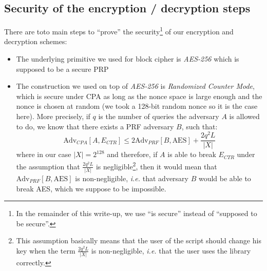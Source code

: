 \documentclass[10pt,twocolumn]{article}
\begin{document}

\subsection{Security of the encryption / decryption steps}\label{security-encryption-decryption}

There are toto main steps to ``prove'' the security\footnote{In the remainder of this write-up, we use ``is secure''
instead of ``supposed to be secure''.}  of our encryption and decryption schemes:
\begin{itemize}
\item The underlying primitive we used for block cipher is \emph{AES-256} which is supposed to be a secure PRP
\item The construction we used on top of \emph{AES-256} is \emph{Randomized Counter Mode}, which is secure under CPA as long as the nonce space is large enough and the nonce is chosen at random (we took a 128-bit random nonce so it is the case here).
More precisely, if $q$ is the number of queries the adversary $A$ is allowed to do, we know that there exists a PRF adversary $B$, such that:
\begin{equation}\label{eq:sec1}
 \text{Adv}_{CPA}[A,E_{CTR}] \leq 2 \text{Adv}_{PRF}[B,\text{AES}] +  \frac{2q^2L}{|X|}
\end{equation}
where in our case $|X| = 2^{128}$ and therefore, if $A$ is able to break $E_{CTR}$ under the assumption that $\frac{2q^2L}{|X|}$ is negligible\footnote{This assumption basically means that the user of the script should change his key when the term $\frac{2q^2L}{|X|}$ is non-negligible, \emph{i.e.} that the user uses the library correctly.}, then it would mean that $\text{Adv}_{PRF}[B,\text{AES}]$ is non-negligible, \emph{i.e.} that adversary $B$ would be able to break AES, which we suppose to be impossible.

\end{itemize}
\end{document}
